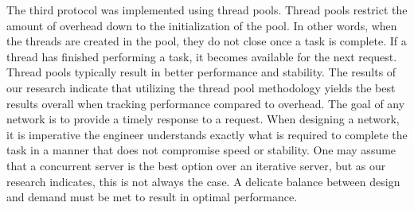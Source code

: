 The third protocol was implemented using thread pools. 
Thread pools restrict the amount of overhead down to the initialization of the pool. 
In other words, when the threads are created in the pool, they do not close once a task is complete. 
If a thread has finished performing a task, it becomes available for the next request. 
Thread pools typically result in better performance and stability. 
The results of our research indicate that utilizing the thread pool methodology yields the best results overall when tracking performance compared to overhead.
The goal of any network is to provide a timely response to a request. 
When designing a network, it is imperative the engineer understands exactly what is required to complete the task in a manner that does not compromise speed or stability. 
One may assume that a concurrent server is the best option over an iterative server, but as our research indicates, this is not always the case. 
A delicate balance between design and demand must be met to result in optimal performance.